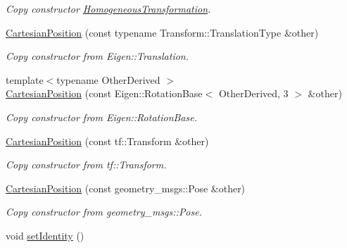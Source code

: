 \begin{DoxyCompactItemize}
\begin{DoxyCompactList}\small\item\em Copy constructor \hyperlink{classow__core_1_1HomogeneousTransformation}{Homogeneous\+Transformation}. \end{DoxyCompactList}\item 
\hyperlink{classow__core_1_1CartesianPosition_a677d43bf7ee688ef2561e3384e0d87af}{Cartesian\+Position} (const typename Transform\+::\+Translation\+Type \&other)
\begin{DoxyCompactList}\small\item\em Copy constructor from Eigen\+::\+Translation. \end{DoxyCompactList}\item 
{\footnotesize template$<$typename Other\+Derived $>$ }\\\hyperlink{classow__core_1_1CartesianPosition_a5facbd98e241518b96c639f645352aff}{Cartesian\+Position} (const Eigen\+::\+Rotation\+Base$<$ Other\+Derived, 3 $>$ \&other)
\begin{DoxyCompactList}\small\item\em Copy constructor from Eigen\+::\+Rotation\+Base. \end{DoxyCompactList}\item 
\hyperlink{classow__core_1_1CartesianPosition_a39f4c6d292b1613e47581e2c5c0584d3}{Cartesian\+Position} (const tf\+::\+Transform \&other)\hypertarget{classow__core_1_1CartesianPosition_a39f4c6d292b1613e47581e2c5c0584d3}{}\label{classow__core_1_1CartesianPosition_a39f4c6d292b1613e47581e2c5c0584d3}

\begin{DoxyCompactList}\small\item\em Copy constructor from tf\+::\+Transform. \end{DoxyCompactList}\item 
\hyperlink{classow__core_1_1CartesianPosition_a12ac7a60828d470c82312a2d9ddcf10a}{Cartesian\+Position} (const geometry\+\_\+msgs\+::\+Pose \&other)\hypertarget{classow__core_1_1CartesianPosition_a12ac7a60828d470c82312a2d9ddcf10a}{}\label{classow__core_1_1CartesianPosition_a12ac7a60828d470c82312a2d9ddcf10a}

\begin{DoxyCompactList}\small\item\em Copy constructor from geometry\+\_\+msgs\+::\+Pose. \end{DoxyCompactList}\item 
void \hyperlink{classow__core_1_1CartesianPosition_a77f179c52a4754479ada9b5ecbdd325a}{set\+Identity} ()\hypertarget{classow__core_1_1CartesianPosition_a77f179c52a4754479ada9b5ecbdd325a}{}\label{classow__core_1_1CartesianPosition_a77f179c52a4754479ada9b5ecbdd325a}


\end{DoxyCompactItemize}
